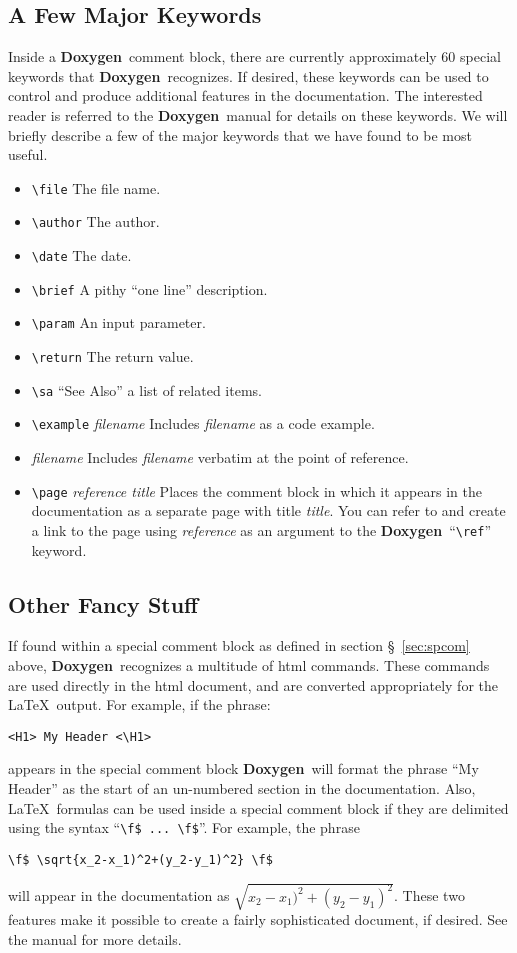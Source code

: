 \documentclass[11pt]{nmemo}
\newcommand{\doxy}{{\normalfont\bfseries Doxygen}}
\begin{document}
\subsection{A Few Major Keywords}

Inside a \doxy\ comment block, there are currently approximately 60
special keywords that \doxy\ recognizes. If desired, these keywords
can be used to control and produce additional features in the
documentation.  The interested reader is referred to the \doxy\ manual
for details on these keywords.  We will briefly describe a few of the major
keywords that we have found to be most useful.
\begin{itemize}
\item \verb+\file+ The file name.
\item \verb+\author+ The author.
\item \verb+\date+ The date.
\item \verb+\brief+ A pithy ``one line'' description.
\item \verb+\param+ An input parameter.
\item \verb+\return+ The return value.
\item \verb+\sa+ ``See Also'' a list of related items.
\item \verb+\example+ {\em filename} Includes {\em filename} as a code
  example.
\item \verb++ {\em filename} Includes {\em filename} verbatim at the
  point of reference.
\item \verb+\page+ {\em reference title} Places the comment block in which
  it appears in the documentation as a separate page with title {\em
    title}. You can refer to and create a link to the page using {\em
    reference} as an argument to the \doxy\ ``\verb+\ref+'' keyword.
\end{itemize}

\subsection{Other Fancy Stuff}

If found within a special comment block 
as defined in section \S~\ref{sec:spcom} above, \doxy\ 
recognizes a multitude of html commands. These
commands are used directly in the html document, and are converted appropriately for
the \LaTeX\ output. 
For example, if the phrase: 
\begin{verbatim}
<H1> My Header <\H1>
\end{verbatim} appears in the special comment
block \doxy\ will format the phrase ``My Header'' as the start of an
un-numbered section in the documentation. 
Also, \LaTeX\ formulas can be used inside a special
comment block if they are delimited using the syntax ``\verb+\f$ ... \f$+''.
For example, the phrase 
\begin{verbatim}
\f$ \sqrt{x_2-x_1)^2+(y_2-y_1)^2} \f$ 
\end{verbatim}  will appear in the
documentation as $\sqrt{x_2-x_1)^2+(y_2-y_1)^2}$.
These two
features make it possible to create a fairly sophisticated document, if desired.
See the manual for more details.
\end{document}

